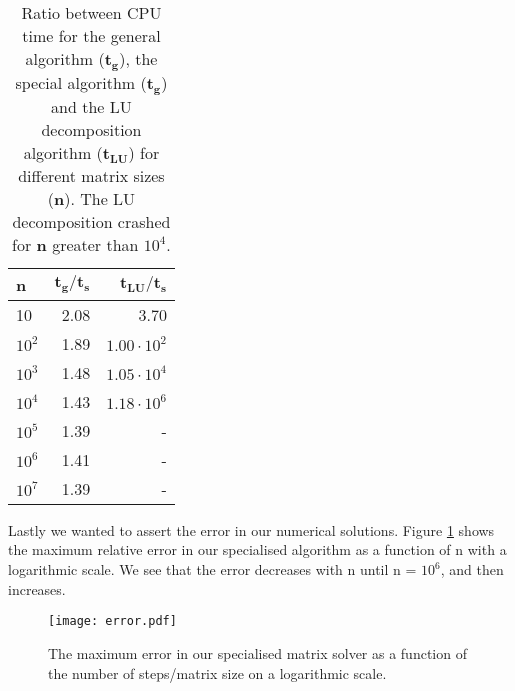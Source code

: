 \begin{table}[htbp]
	\centering
	\begin{tabular}{lrr}
		\textbf{n} & $\mathbf{{t_g}/{t_s}}$ & $\mathbf{{t_{LU}}/{t_s}}$  \\
		\midrule
		\addlinespace[0.1cm]

		10         & 2.08                                                                                          & 3.70                                                                                        \\
		$10^2$       & 1.89                                                                                          & $1.00\cdot 10^2 $                                                                                         \\
		$10^3$       & 1.48                                                                                          & $1.05 \cdot 10^4 $                                                                                        \\
		$10^4$       & 1.43                                                                                          & $1.18 \cdot 10^6$                                                                                         \\
		$10^5$       & 1.39                                                                                          & -                                                                                         \\
		$10^6$       & 1.41                                                                                          & -                                                                                        \\
		$10^7$       & 1.39                                                                                          &    -
	\end{tabular}  \caption{Ratio between CPU time for the general algorithm ($\mathbf{t_g}$), the special algorithm ($\mathbf{t_g}$) and the LU decomposition algorithm ($\mathbf{t_{LU}}$) for different matrix sizes (\textbf{n}). The LU decomposition crashed for \textbf{n} greater than $10^4$.} \label{table:time}
\end{table}

Lastly we wanted to assert the error in our numerical solutions. Figure \ref{fig:error} shows the maximum relative error in our specialised algorithm as a function of n with a logarithmic scale. We see that the error decreases with n until n = $10^6$, and then increases.

\begin{figure}[htbp]
	\centering
	\texttt{[image: error.pdf]}
	\caption{The maximum error in our specialised matrix solver as a function of the number of steps/matrix size on a logarithmic scale.}
	\label{fig:error}
\end{figure}

